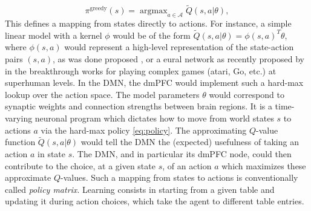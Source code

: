 \documentclass[10pt,letterpaper]{article}
\DeclareMathOperator{\argmax}{argmax}
\begin{document}
\begin{equation}
  \pi^{\text{greedy}}(s) = \argmax_{a \in \mathcal A}\tilde{Q}(s, a|\theta),
  \label{eq:policy}
\end{equation}
This defines a mapping from states directly to actions.
For instance, a simple linear model with a kernel $\phi$ would be of the
form $\tilde{Q}(s, a|\theta) = \phi(s,a)^T\theta$, where
$\phi(s,a)$ would represent a high-level representation of the state-action pairs
$(s,a)$, as was done proposed \citep{songNIPS2016}, or a eural network as recently proposed by in the
breakthrough works
\citep{mnih2015,silver2016mastering} for playing complex games (atari, Go, etc.) at superhuman levels.
In the DMN, the dmPFC would implement such a hard-max lookup
over the action space.
The model
  parameters $\theta$ would correspond to synaptic weights and connection strengths between
  brain regions. It is a time-varying neuronal program which dictates how to move from world states $s$ to actions $a$ via the hard-max policy \eqref{eq:policy}.
  The approximating $Q$-value function $\tilde{Q}(s, a|\theta)$ would tell the DMN the (expected) usefulness of taking an action $a$ in state $s$.
  The DMN, and in particular its dmPFC node, could then contribute to the choice, at a given state $s$, of an action $a$ which maximizes these approximate
  $Q$-values. Such a mapping from states to actions is conventionally called \textit{policy matrix}\citep{mnih2015,silver2016mastering}.
  Learning consists in starting from a given table and
  updating it during action choices,
  which take the agent to different table entries.


\end{document}
